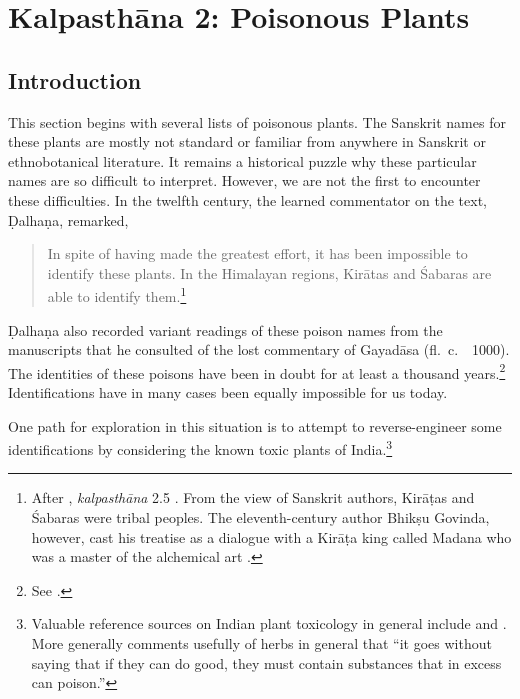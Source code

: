 \newcommand{\plant}[4]{#1 (\emph{#2})\footnoteA{#3; see #4}}
\let\chemical = \plant
\newcommand{\skt}[2]{#1 (\emph{#2})}
\newcommand{\sskt}[2]{\empty}
%

\chapter{Kalpasthāna 2: Poisonous Plants}

\section{Introduction}

This section begins with several lists of poisonous plants.  The
Sanskrit names for these plants are mostly not standard or familiar
from anywhere in Sanskrit or ethnobotanical literature.  It remains a
historical puzzle why these particular names are so difficult to
interpret. However, we are not the first to encounter these
difficulties. In the twelfth century, the learned commentator on the
text, Ḍalhaṇa, remarked,
\begin{quote}
In spite of having made the greatest effort, it has been impossible to
identify these plants. In the Himalayan regions, Kirātas and Śabaras
are able to identify them.\footnote{After \SS, \emph{kalpasthāna} 2.5
    \citep[564]{vulgate}. From the view of Sanskrit authors, Kirāṭas and
    Śabaras were tribal peoples.  The eleventh-century author Bhikṣu
    Govinda, however, cast his treatise as a dialogue with a Kirāṭa king
    called Madana who was a master of the alchemical art \citep[IIA,
    620]{meul-hist}.}
\end{quote}
Ḍalhaṇa also recorded variant readings of these poison names from the
manuscripts that he consulted of the lost commentary of Gayadāsa (fl.\
c.\ \AD\ 1000). The identities of these poisons have been in doubt for
at least a thousand years.\footnote{See \cite[80--81]{wuja-2003}.} 
    Identifications have in many cases been equally impossible for us
    today.

One path for exploration in this situation is to attempt to
reverse-engineer some identifications by considering the known toxic
plants of India.\footnote{Valuable reference sources on Indian plant
    toxicology in general include \cite[chs.\,10, 11]{pill-2013} and
    \cite[parts 1.II, 3 and 4]{barc-2008}. More generally \citet[41 et
    passim]{bown-2001} comments usefully of herbs in general that “it goes
    without saying that if they can do good, they must contain substances
    that in excess can poison.”}

